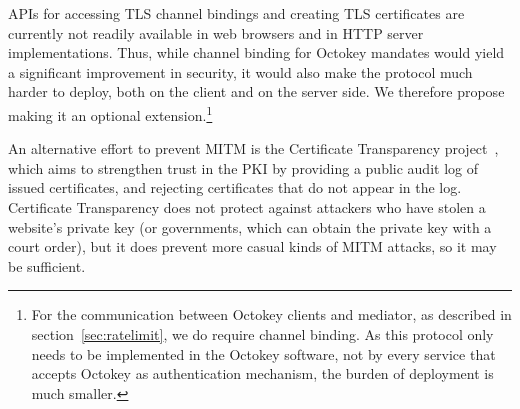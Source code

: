 APIs for accessing TLS channel bindings and creating TLS certificates are currently not readily
available in web browsers and in HTTP server implementations. Thus, while channel binding for
Octokey mandates would yield a significant improvement in security, it would also make the protocol
much harder to deploy, both on the client and on the server side. We therefore propose making it an
optional extension.\footnote{For the communication between Octokey clients and mediator, as
described in section~\ref{sec:ratelimit}, we do require channel binding. As this protocol only needs
to be implemented in the Octokey software, not by every service that accepts Octokey as
authentication mechanism, the burden of deployment is much smaller.}

An alternative effort to prevent MITM is the Certificate Transparency project~\cite{CertTrans},
which aims to strengthen trust in the PKI by providing a public audit log of issued certificates,
and rejecting certificates that do not appear in the log. Certificate Transparency does not protect
against attackers who have stolen a website's private key (or governments, which can obtain the
private key with a court order), but it does prevent more casual kinds of MITM attacks, so it may be
sufficient.
